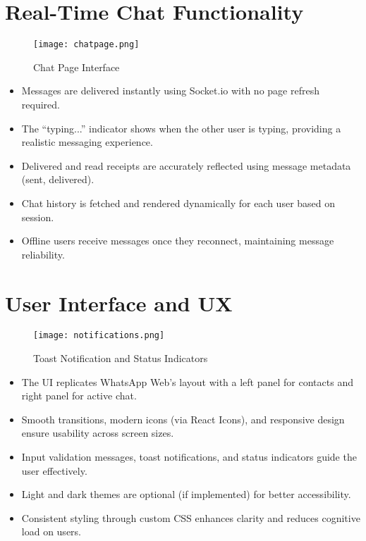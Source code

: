 \documentclass[12pt,a4paper]{report}
\begin{document}
\section{Real-Time Chat Functionality}

\begin{figure}[H]
    \centering
    \texttt{[image: chatpage.png]}
    \caption{Chat Page Interface}
\end{figure}

\begin{itemize}
    \item Messages are delivered instantly using Socket.io with no page refresh required.
    \item The “typing...” indicator shows when the other user is typing, providing a realistic messaging experience.
    \item Delivered and read receipts are accurately reflected using message metadata (sent, delivered).
    \item Chat history is fetched and rendered dynamically for each user based on session.
    \item Offline users receive messages once they reconnect, maintaining message reliability.
\end{itemize}

\section{User Interface and UX}

\begin{figure}[H]
    \centering
    \texttt{[image: notifications.png]}
    \caption{Toast Notification and Status Indicators}
\end{figure}

\begin{itemize}
    \item The UI replicates WhatsApp Web’s layout with a left panel for contacts and right panel for active chat.
    \item Smooth transitions, modern icons (via React Icons), and responsive design ensure usability across screen sizes.
    \item Input validation messages, toast notifications, and status indicators guide the user effectively.
    \item Light and dark themes are optional (if implemented) for better accessibility.
    \item Consistent styling through custom CSS enhances clarity and reduces cognitive load on users.
\end{itemize}
\end{document}
